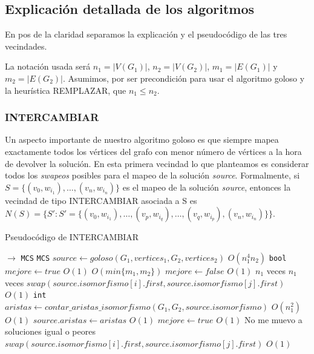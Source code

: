 \subsection{Explicación detallada de los algoritmos}
En pos de la claridad separamos la explicación y el pseudocódigo de las tres vecindades. 

La notación usada será $n_1 = |V(G_1)|$, $n_2 = |V(G_2)|$, $m_1 = |E(G_1)|$ y $m_2 = |E(G_2)|$. Asumimos, por ser precondición para usar el algoritmo goloso y la heurística REMPLAZAR, que $n_1 \leq n_2$. 

\subsubsection{INTERCAMBIAR}
Un aspecto importante de nuestro algoritmo goloso es que siempre mapea exactamente todos los vértices del grafo con menor número de vértices a la hora de devolver la solución. En esta primera vecindad lo que planteamos es considerar todos los \emph{swapeos} posibles para el mapeo de la solución \emph{source}. Formalmente, si $S = \{(v_0, w_{i_1}),\hdots , (v_n, w_{i_n})\}$ es el mapeo de la solución \emph{source}, entonces la vecindad de tipo INTERCAMBIAR asociada a S es $N(S) = \{S' : S' = \{(v_0, w_{i_1}),\hdots , (v_p, w_{i_q}) , \hdots, (v_q, w_{i_p}), (v_n, w_{i_n})\}\}$.

\begin{algorithm}[H]
  \small
  \begin{algorithmic}[1]
  \caption{Pseudocódigo de INTERCAMBIAR}
  \label{algo:5-1}
    $\rightarrow$ \texttt{MCS}
      \State \texttt{MCS} $source \gets goloso(G_1, vertices_1, G_2, vertices_2)$
      \Comment $O(n_1^4n_2)$
      \State \texttt{bool} $mejore \gets true$
      \Comment $O(1)$
      \Comment $O(min\{m_1, m_2\})$
        \State $mejore \gets false$
        \Comment $O(1)$
        \Comment $n_1$ veces
          \Comment $n_1$ veces
            \State $swap(source.isomorfismo[i].first, source.isomorfismo[j].first)$
            \Comment $O(1)$
            \State \texttt{int} $aristas \gets contar\_aristas\_isomorfismo(G_1, G_2, source.isomorfismo)$
            \Comment $O(n_1^2)$
            \Comment $O(1)$
              \State $source.aristas \gets aristas$ 
              \Comment $O(1)$             
              \State $mejore \gets true$
              \Comment $O(1)$
            \Else
            \Comment No me muevo a soluciones igual o peores
              \State $swap(source.isomorfismo[i].first, source.isomorfismo[j].first)$
              \Comment $O(1)$
            \EndIf
          \EndFor
        \EndFor
      \EndWhile
    \EndProcedure
  \end{algorithmic}
\end{algorithm}

